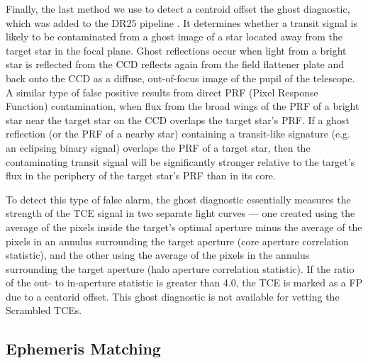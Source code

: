Finally, the last method we use to detect a centroid offset the ghost diagnostic, which was added to the DR25 \kepler{} pipeline \citep{Twicken2016}. It determines whether a transit signal is likely to be contaminated from a ghost image of a star located away from the target star in the focal plane. Ghost reflections occur when light from a bright star is reflected from the CCD reflects again from the field flattener plate and back onto the CCD as a diffuse, out-of-focus image of the pupil of
the telescope. A similar type of false positive results from direct PRF (Pixel Response Function) contamination, when flux from the broad wings of the PRF of a bright star near the target star on the CCD overlaps the target star's PRF.  If a ghost reflection (or the PRF of a nearby star) containing a transit-like signature (e.g. an eclipsing binary signal) overlaps the PRF of a target star, then the contaminating transit signal will be significantly stronger relative to the target's flux in the periphery of the target star's PRF than in its core.


To detect this type of false alarm, the ghost diagnostic essentially measures the strength of the TCE signal in two separate light curves --- one created using the average of the pixels inside the target's optimal aperture minus the average of the pixels in an annulus surrounding the target aperture (core aperture correlation statistic), and the other using the average of the pixels in the annulus surrounding the target aperture (halo aperture correlation statistic). If the ratio of the out- to in-aperture statistic is greater than 4.0, the TCE is marked as a FP due to a centorid offset. This ghost diagnostic is not available for vetting the Scrambled TCEs.  


\subsection{Ephemeris Matching}
\label{ephemmatchsec}

